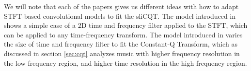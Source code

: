 \documentclass[report.tex]{subfiles}
\begin{document}
We will note that each of the papers gives us different ideas with how to adapt STFT-based convolutional models to fit the sliCQT. The model introduced in \textcite{plumbley1} shows a simple case of a 2D time and frequency filter applied to the STFT, which can be applied to any time-frequency transform. The model introduced in \textcite{plumbley2} varies the size of time and frequency filter to fit the Constant-Q Transform, which as discussed in section \ref{sec:cqt} analyzes music with higher frequency resolution in the low frequency region, and higher time resolution in the high frequency region.
\end{document}
